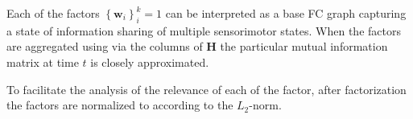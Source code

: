 Each of the factors $\left\lbrace\bm{w}_i\right\rbrace^k_i=1$ can be interpreted as a base FC graph capturing
a state of information sharing of multiple sensorimotor states. When the factors are aggregated using via the columns of $\bm{H}$ the particular mutual information matrix at time $t$ is closely approximated.

To facilitate the analysis of the relevance of each of the factor, after factorization the factors are normalized to according to the $L_2$-norm. 

%





